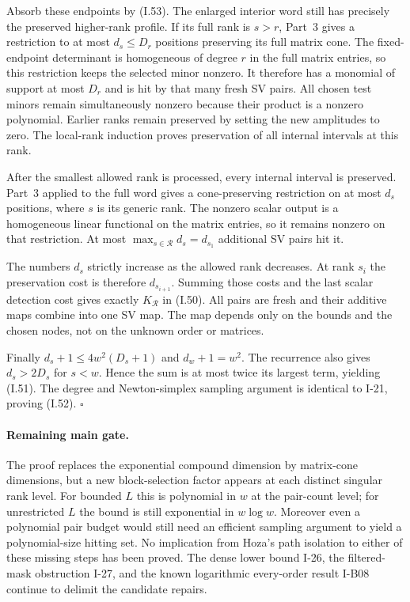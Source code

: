 Absorb these endpoints by (I.53).  The enlarged interior
word still has precisely the preserved higher-rank profile.
If its full rank is $s>r$, Part~3 gives a restriction to at
most $d_s\le D_r$ positions preserving its full matrix cone.
The fixed-endpoint determinant is homogeneous of degree
$r$ in the full matrix entries, so this restriction keeps
the selected minor nonzero.  It therefore has a monomial
of support at most $D_r$ and is hit by that many fresh SV
pairs.  All chosen test minors remain simultaneously nonzero
because their product is a nonzero polynomial.  Earlier
ranks remain preserved by setting the new amplitudes to zero.
The local-rank induction proves preservation of all internal
intervals at this rank.

After the smallest allowed rank is processed, every internal
interval is preserved.  Part~3 applied to the full word gives
a cone-preserving restriction on at most $d_s$ positions,
where $s$ is its generic rank.  The nonzero scalar output
is a homogeneous linear functional on the matrix entries,
so it remains nonzero on that restriction.  At most
$\max_{s\in\mathcal R}d_s=d_{s_1}$ additional SV pairs hit it.

The numbers $d_s$ strictly increase as the allowed rank
decreases.  At rank $s_i$ the preservation cost is therefore
$d_{s_{i+1}}$.  Summing those costs and the last scalar
detection cost gives exactly $K_{\mathcal R}$ in (I.50).
All pairs are fresh and their additive maps combine into
one SV map.  The map depends only on the bounds and the
chosen nodes, not on the unknown order or matrices.

Finally $d_s+1\le4w^2(D_s+1)$ and $d_w+1=w^2$.
The recurrence also gives $d_s>2D_s$ for $s<w$.
Hence the sum is at most twice its largest term, yielding
(I.51).  The degree and Newton-simplex sampling argument is
identical to I-21, proving (I.52).
\hfill$\square$

\paragraph{Remaining main gate.}
The proof replaces the exponential compound dimension by
matrix-cone dimensions, but a new block-selection factor
appears at each distinct singular rank level.  For bounded
$L$ this is polynomial in $w$ at the pair-count level;
for unrestricted $L$ the bound is still exponential in
$w\log w$.  Moreover even a polynomial pair budget would
still need an efficient sampling argument to yield a
polynomial-size hitting set.  No implication from Hoza's
path isolation to either of these missing steps has been
proved.  The dense lower bound I-26, the filtered-mask
obstruction I-27, and the known logarithmic every-order
result I-B08 continue to delimit the candidate repairs.


